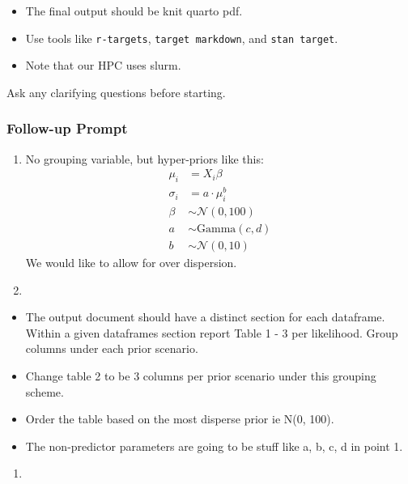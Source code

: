 \documentclass[
  letterpaper,
]{article}
\providecommand{\tightlist}{%
  \setlength{\itemsep}{0pt}\setlength{\parskip}{0pt}}\usepackage{longtable,booktabs,array}
\begin{document}
\begin{itemize}
\item
  The final output should be knit quarto pdf.
\item
  Use tools like \texttt{r-targets}, \texttt{target\ markdown}, and
  \texttt{stan\ target}.
\item
  Note that our HPC uses slurm.
\end{itemize}

Ask any clarifying questions before starting.

\subsubsection{Follow-up Prompt}\label{follow-up-prompt}

\begin{enumerate}
\def\labelenumi{\arabic{enumi}.}
\item
  No grouping variable, but hyper-priors like this:\\
  \begin{equation*}
  \begin{aligned} 
   \mu_i &= X_i \beta \\ 
   \sigma_i &= a \cdot \mu_i^b \\
   \beta &\sim \mathcal{N}(0, 100) \\
   a &\sim \text{Gamma}(c, d) \\ 
   b &\sim \mathcal{N}(0, 10)
  \end{aligned}
  \end{equation*} We would like to allow for over dispersion.
\item
\end{enumerate}

\begin{itemize}
\item
  The output document should have a distinct section for each dataframe.
  Within a given dataframes section report Table 1 - 3 per likelihood.
  Group columns under each prior scenario.
\item
  Change table 2 to be 3 columns per prior scenario under this grouping
  scheme.
\item
  Order the table based on the most disperse prior ie N(0, 100).
\item
  The non-predictor parameters are going to be stuff like a, b, c, d in
  point 1.
\end{itemize}

\begin{enumerate}
\def\labelenumi{\arabic{enumi}.}
\setcounter{enumi}{2}
\tightlist
\item
\end{enumerate}
\end{document}
